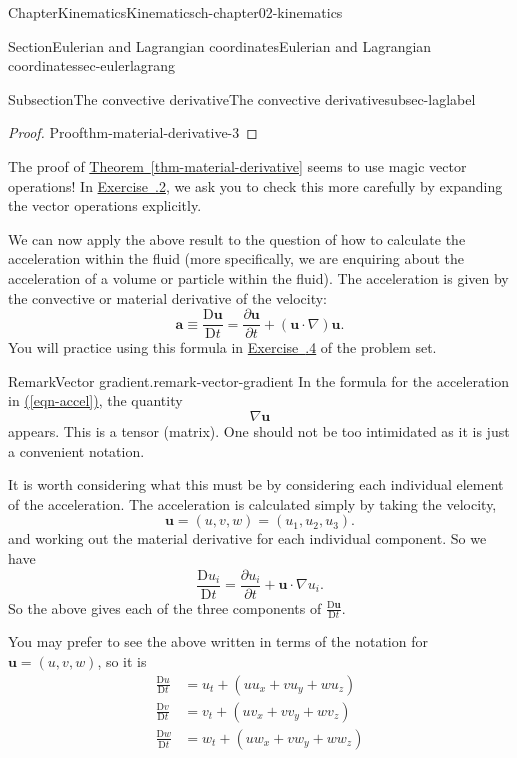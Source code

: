 \documentclass[oneside,10pt,]{book}
\newcommand{\xreffont}{\relax}
\numberwithin{equation}{section}
\newcommand{\DD}[2]{\frac{\mathrm{D}#1}{\mathrm{D}#2}}
\newcommand{\pd}[2]{\frac{\partial#1}{\partial#2}}
\newcommand{\bu}{\boldsymbol{u}}
\newcommand{\ba}{\boldsymbol{a}}
\newcommand{\amp}{&}
\begin{document}
\begin{chapterptx}{Chapter}{Kinematics}{}{Kinematics}{}{}{ch-chapter02-kinematics}
\begin{sectionptx}{Section}{Eulerian and Lagrangian coordinates}{}{Eulerian and Lagrangian coordinates}{}{}{sec-eulerlagrang}
\begin{subsectionptx}{Subsection}{The convective derivative}{}{The convective derivative}{}{}{subsec-laglabel}
\begin{proof}{Proof}{}{thm-material-derivative-3}
%
\end{proof}
The proof of \hyperref[thm-material-derivative]{Theorem~{\xreffont\ref{thm-material-derivative}}} seems to use magic vector operations! In \hyperlink{ex-material-derivative}{Exercise~{\xreffont 2.3.2}}, we ask you to check this more carefully by expanding the vector operations explicitly.%
\par
We can now apply the above result to the question of how to calculate the acceleration within the fluid (more specifically, we are enquiring about the acceleration of a volume or particle within the fluid). The acceleration is given by the convective or material derivative of the velocity:%
\begin{equation}
\ba \equiv \DD{\bu}{t} = \pd{\bu}{t} + (\bu \cdot \nabla) \bu.\label{eqn-accel}
\end{equation}
You will practice using this formula in \hyperlink{ex-hw-eulerian-lagrangian2}{Exercise~{\xreffont 2.3.4}} of the problem set.%
\begin{remark}{Remark}{Vector gradient.}{remark-vector-gradient}%
In the formula for the acceleration in \hyperref[eqn-accel]{({\xreffont\ref{eqn-accel}})}, the quantity%
\begin{equation*}
\nabla \bu
\end{equation*}
appears. This is a tensor (matrix). One should not be too intimidated as it is just a convenient notation.%
\par
It is worth considering what this must be by considering each individual element of the acceleration. The acceleration is calculated simply by taking the velocity,%
\begin{equation*}
\bu = (u, v, w) = (u_1, u_2, u_3).
\end{equation*}
and working out the material derivative for each individual component. So we have%
\begin{equation}
\DD{u_i}{t} = \pd{u_i}{t} + \bu \cdot \nabla u_i.\label{eqn-material-deriv-ui}
\end{equation}
So the above gives each of the three components of \(\DD{\bu}{t}\).%
\par
You may prefer to see the above written in terms of the notation for \(\bu = (u, v, w)\), so it is%
\begin{align*}
\DD{u}{t} \amp= u_t + (u u_x + v u_y + w u_z)\\
\DD{v}{t} \amp= v_t + (u v_x + v v_y + w v_z)\\
\DD{w}{t} \amp= w_t + (u w_x + v w_y + w w_z)
\end{align*}

\end{remark}
\end{subsectionptx}
\end{sectionptx}
\end{chapterptx}
\end{document}
